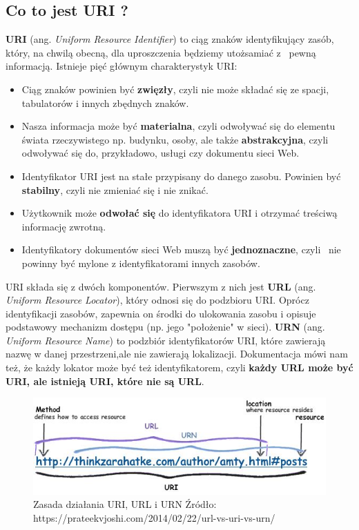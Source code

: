 \documentclass[oneside,polski,logo,indent]{amuthesis}
\begin{document}
\begin{center}
\subsection{Co to jest URI ?}
\end{center}
\textbf{URI} (ang. \emph{Uniform Resource Identifier}) to ciąg znaków identyfikujący zasób, który, na chwilą obecną, dla uproszczenia będziemy utożsamiać z~ pewną informacją. Istnieje pięć głównym charakterystyk URI:

\begin{itemize}
\item Ciąg znaków powinien być \textbf{zwięzły}, czyli nie może składać się ze spacji, tabulatorów i innych zbędnych znaków.\newline
\item Nasza informacja może być \textbf{materialna}, czyli odwoływać się do elementu świata rzeczywistego np. budynku, osoby, ale także \textbf{abstrakcyjna}, czyli odwoływać się do, przykładowo, usługi czy dokumentu sieci Web.\newline
\item Identyfikator URI jest na stałe przypisany do danego zasobu. Powinien być \textbf{stabilny}, czyli nie zmieniać się i nie znikać.\newline
\item Użytkownik może \textbf{odwołać się} do identyfikatora URI i otrzymać treściwą informację zwrotną.\newline
\item Identyfikatory dokumentów sieci Web muszą być \textbf{jednoznaczne}, czyli~ nie powinny być mylone z identyfikatorami innych zasobów.\newline
\end{itemize}
URI składa się z dwóch komponentów. Pierwszym z nich jest \textbf{URL} (ang. \emph{Uniform Resource Locator}), który odnosi się do podzbioru URI. Oprócz identyfikacji zasobów, zapewnia on środki do ulokowania zasobu i opisuje podstawowy mechanizm dostępu (np. jego "położenie" w sieci). \textbf{URN} (ang. \emph{Uniform Resource Name}) to podzbiór identyfikatorów URI, które zawierają nazwę w danej przestrzeni,\break ale nie zawierają lokalizacji. Dokumentacja mówi nam też, że każdy lokator może być też identyfikatorem, czyli \textbf{każdy URL może być URI, ale istnieją URI, które nie są URL}.

\begin{figure}[H]
\centering
\includegraphics[width=14cm]{uri.jpg}
\caption{Zasada działania URI, URL i URN\newline
Źródło: https://prateekvjoshi.com/2014/02/22/url-vs-uri-vs-urn/}
\label{Cache}
\end{figure}
\end{document}
